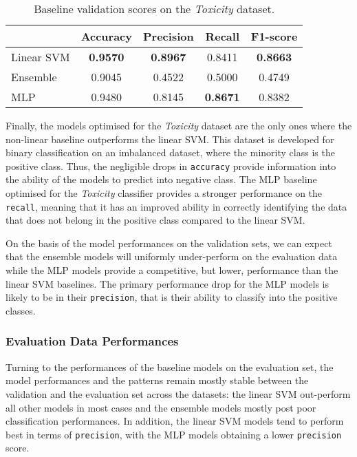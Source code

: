 \begin{table}[h]
  \centering
  \begin{tabular}{l|cccc}
                & Accuracy        & Precision       & Recall          & F1-score        \\ \hline
    Linear SVM  & \textbf{0.9570} & \textbf{0.8967} & 0.8411          & \textbf{0.8663}          \\
    Ensemble    & 0.9045          & 0.4522          & 0.5000          & 0.4749          \\
    MLP         & 0.9480          & 0.8145          & \textbf{0.8671} & 0.8382
  \end{tabular}
  \caption{Baseline validation scores on the \textit{Toxicity} dataset.}
  \label{tab:baseline_dev_wulczyn}
\end{table}

Finally, the models optimised for the \textit{Toxicity} dataset are the only ones where the non-linear baseline outperforms the linear SVM.
This dataset is developed for binary classification on an imbalanced dataset, where the minority class is the positive class.
Thus, the negligible drops in \texttt{accuracy} provide information into the ability of the models to predict into negative class.
The MLP baseline optimised for the \textit{Toxicity} classifier provides a stronger performance on the \texttt{recall}, meaning that it has an improved ability in correctly identifying the data that does not belong in the positive class compared to the linear SVM.

On the basis of the model performances on the validation sets, we can expect that the ensemble models will uniformly under-perform on the evaluation data while the MLP models provide a competitive, but lower, performance than the linear SVM baselines.
The primary performance drop for the MLP models is likely to be in their \texttt{precision}, that is their ability to classify into the positive classes.

\subsubsection{Evaluation Data Performances}
Turning to the performances of the baseline models on the evaluation set, the model performances and the patterns remain mostly stable between the validation and the evaluation set across the datasets: the linear SVM out-perform all other models in most cases and the ensemble models mostly post poor classification performances.
In addition, the linear SVM models tend to perform best in terms of \texttt{precision}, with the MLP models obtaining a lower \texttt{precision} score.

